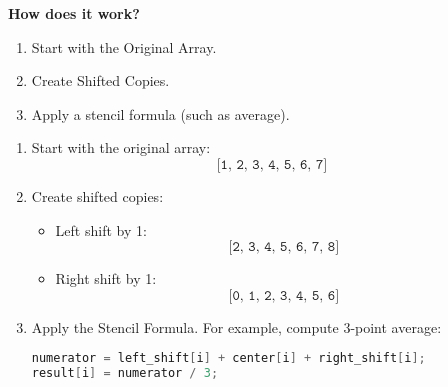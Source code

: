 \highspace
\begin{flushleft}
    \textcolor{Green3}{\faIcon{\speedIcon} \textbf{How does it work?}}
\end{flushleft}
\begin{enumerate}
    \item Start with the Original Array.
    \item Create Shifted Copies.
    \item Apply a stencil formula (such as average).
\end{enumerate}
\begin{examplebox}
    \begin{enumerate}
        \item Start with the original array:
        \begin{equation*}
            \texttt{[1, 2, 3, 4, 5, 6, 7]}
        \end{equation*}

        \item Create shifted copies:
        \begin{itemize}
            \item Left shift by 1:
            \begin{equation*}
                \texttt{[2, 3, 4, 5, 6, 7, 8]}
            \end{equation*}
            \item Right shift by 1:
            \begin{equation*}
                \texttt{[0, 1, 2, 3, 4, 5, 6]}
            \end{equation*}
        \end{itemize}

        \item Apply the Stencil Formula. For example, compute 3-point average:
        \begin{lstlisting}[language=c++]
numerator = left_shift[i] + center[i] + right_shift[i];
result[i] = numerator / 3;\end{lstlisting}
    \end{enumerate}
\end{examplebox}
